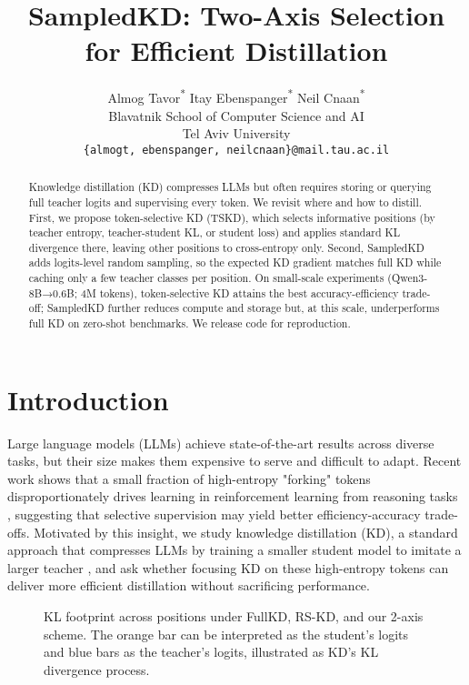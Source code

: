 \documentclass[11pt]{article}
\title{SampledKD: Two-Axis Selection for Efficient Distillation}
\author{
  Almog Tavor\textsuperscript{*} \qquad Itay Ebenspanger\textsuperscript{*} \qquad Neil Cnaan\textsuperscript{*} \\
  Blavatnik School of Computer Science and AI \\
  Tel Aviv University \\
  \texttt{\{almogt, ebenspanger, neilcnaan\}@mail.tau.ac.il} \\
}
\begin{document}
\maketitle
\let\thefootnote\relax
\footnotemark
{}
\begin{abstract}
	Knowledge distillation (KD) compresses LLMs but often requires storing or querying full teacher logits and supervising every token.
	We revisit where and how to distill.
	First, we propose token-selective KD (TSKD), which selects informative positions (by teacher entropy, teacher-student KL, or student loss) and applies standard KL divergence there, leaving other positions to cross-entropy only.
	Second, SampledKD adds logits-level random sampling, so the expected KD gradient matches full KD while caching only a few teacher classes per position.
	On small-scale experiments (Qwen3-8B→0.6B; 4M tokens), token-selective KD attains the best accuracy-efficiency trade-off; SampledKD further reduces compute and storage but, at this scale, underperforms full KD on zero-shot benchmarks.
	We release code for reproduction.
\end{abstract}

\section{Introduction}

Large language models (LLMs) achieve state-of-the-art results across diverse tasks, but their size makes them expensive to serve and difficult to adapt.
Recent work shows that a small fraction of high-entropy "forking" tokens disproportionately drives learning in reinforcement learning from reasoning tasks \citep{wang2025highentropy}, suggesting that selective supervision may yield better efficiency-accuracy trade-offs.
Motivated by this insight, we study knowledge distillation (KD), a standard approach that compresses LLMs by training a smaller student model to imitate a larger teacher \citep{hinton2015distillation}, and ask whether focusing KD on these high-entropy tokens can deliver more efficient distillation without sacrificing performance.

\begin{figure}[t!]
	\begin{flushright}
		\resizebox{\columnwidth}{!}{}
	\end{flushright}
	\caption{KL footprint across positions under FullKD, RS-KD, and our 2-axis scheme. The orange bar can be interpreted as the student's logits and blue bars as the teacher's logits, illustrated as KD's KL divergence process.}
	\label{fig:kd_intuition}
\end{figure}
\end{document}
